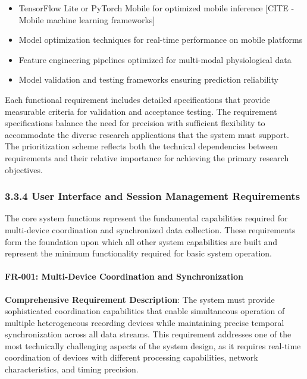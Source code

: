\documentclass[12pt,a4paper]{article}
\begin{document}
\begin{itemize}
\item TensorFlow Lite or PyTorch Mobile for optimized mobile inference [CITE - Mobile machine learning frameworks]
\item Model optimization techniques for real-time performance on mobile platforms
\item Feature engineering pipelines optimized for multi-modal physiological data
\item Model validation and testing frameworks ensuring prediction reliability

\end{itemize}
Each functional requirement includes detailed specifications that provide measurable criteria for validation and
acceptance testing. The requirement specifications balance the need for precision with sufficient flexibility to
accommodate the diverse research applications that the system must support. The prioritization scheme reflects both the
technical dependencies between requirements and their relative importance for achieving the primary research objectives.

\subsubsection{3.3.4 User Interface and Session Management Requirements}

The core system functions represent the fundamental capabilities required for multi-device coordination and synchronized
data collection. These requirements form the foundation upon which all other system capabilities are built and represent
the minimum functionality required for basic system operation.

\paragraph{FR-001: Multi-Device Coordination and Synchronization}

\textbf{Comprehensive Requirement Description}: The system must provide sophisticated coordination capabilities that enable
simultaneous operation of multiple heterogeneous recording devices while maintaining precise temporal synchronization
across all data streams. This requirement addresses one of the most technically challenging aspects of the system
design, as it requires real-time coordination of devices with different processing capabilities, network
characteristics, and timing precision.
\end{document}
